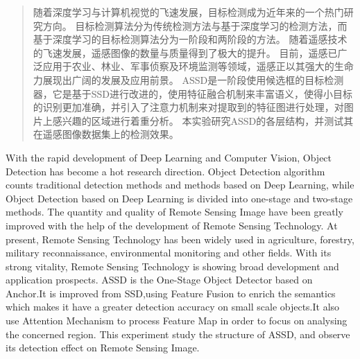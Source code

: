 

\begin{abstract}
随着深度学习与计算机视觉的飞速发展，目标检测成为近年来的一个热门研究方向。
目标检测算法分为传统检测方法与基于深度学习的检测方法，而基于深度学习的目标检测算法分为一阶段和两阶段的方法。
随着遥感技术的飞速发展，遥感图像的数量与质量得到了极大的提升。
目前，遥感已广泛应用于农业、林业、军事侦察及环境监测等领域，遥感正以其强大的生命力展现出广阔的发展及应用前景。
ASSD是一阶段使用候选框的目标检测器，它是基于SSD进行改进的，使用特征融合机制来丰富语义，使得小目标的识别更加准确，并引入了注意力机制来对提取到的特征图进行处理，对图片上感兴趣的区域进行着重分析。
本实验研究ASSD的各层结构，并测试其在遥感图像数据集上的检测效果。
\end{abstract}

\begin{abstract*}
With the rapid development of Deep Learning and Computer Vision, Object Detection has become a hot research direction.
Object Detection algorithm counts traditional detection methods and methods based on Deep Learning, while Object Detection based on Deep Learning is divided into one-stage and two-stage methods.
The quantity and quality of Remote Sensing Image have been greatly improved with the help of the development of Remote Sensing Technology.
At present, Remote Sensing Technology has been widely used in agriculture, forestry, military reconnaissance, environmental monitoring and other fields. With its strong vitality, Remote Sensing Technology is showing broad development and application prospects.
ASSD is the One-Stage Object Detector based on Anchor.It is improved from SSD,using Feature Fusion to enrich
the semantics which makes it have a greater detection accuracy on small scale objects.It also use Attention Mechanism to process Feature Map in order to focus on analysing the concerned region. 
This experiment study the structure of ASSD, and observe its detection effect on Remote Sensing Image.
\end{abstract*}
